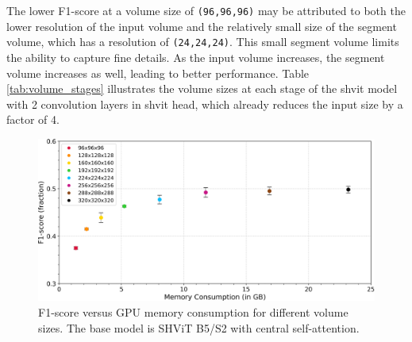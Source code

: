 The lower F1-score at a volume size of {\tt (96,96,96)} may be attributed to both the lower resolution of the input volume and the relatively small size of the segment volume, which has a resolution of {\tt (24,24,24)}. This small segment volume limits the ability to capture fine details. As the input volume increases, the segment volume increases as well, leading to better performance. Table \ref{tab:volume_stages} illustrates the volume sizes at each stage of the \gls{shvit} model with 2 convolution layers in \gls{shvit} head, which already reduces the input size by a factor of 4.
\begin{figure}[H]
	\centering
	\includegraphics[width=1.0\textwidth]{./images/F1_vs_vol_memory.png}
	\caption[F1-score versus GPU memory consumption for different volume sizes]{F1-score versus GPU memory consumption for different volume sizes. The base model is SHViT B5/S2 with central self-attention.}
	\label{iou_vs_vol_memory}
\end{figure}


